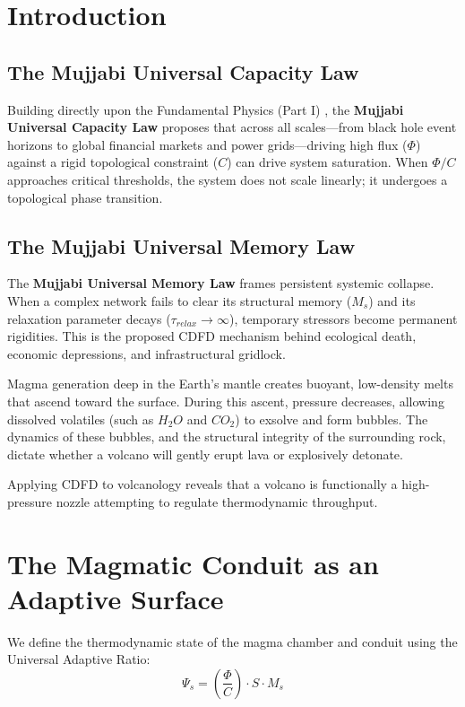 \documentclass[11pt,a4paper]{article}
\begin{document}
\section{Introduction}

\subsection{The Mujjabi Universal Capacity Law}
Building directly upon the Fundamental Physics (Part I) \cite{MujjabiPartI2026}, the \textbf{Mujjabi Universal Capacity Law} proposes that across all scales---from black hole event horizons to global financial markets and power grids---driving high flux ($\Phi$) against a rigid topological constraint ($C$) can drive system saturation. When $\Phi/C$ approaches critical thresholds, the system does not scale linearly; it undergoes a topological phase transition.

\subsection{The Mujjabi Universal Memory Law}
The \textbf{Mujjabi Universal Memory Law} frames persistent systemic collapse. When a complex network fails to clear its structural memory ($M_s$) and its relaxation parameter decays ($\tau_{relax} \to \infty$), temporary stressors become permanent rigidities. This is the proposed CDFD mechanism behind ecological death, economic depressions, and infrastructural gridlock.

Magma generation deep in the Earth's mantle creates buoyant, low-density melts that ascend toward the surface. During this ascent, pressure decreases, allowing dissolved volatiles (such as $H_2O$ and $CO_2$) to exsolve and form bubbles. The dynamics of these bubbles, and the structural integrity of the surrounding rock, dictate whether a volcano will gently erupt lava or explosively detonate.

Applying CDFD to volcanology reveals that a volcano is functionally a high-pressure nozzle attempting to regulate thermodynamic throughput.

\section{The Magmatic Conduit as an Adaptive Surface}
We define the thermodynamic state of the magma chamber and conduit using the Universal Adaptive Ratio:
\begin{equation}
    \Psi_s = \left( \frac{\Phi}{C} \right) \cdot S \cdot M_s
\end{equation}
\end{document}
